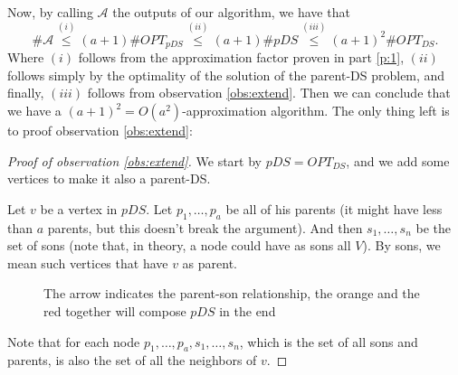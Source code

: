 \documentclass[11pt]{article}
\begin{document}
\begin{enumerate}
    Now, by calling $\mathcal{A}$ the outputs of our algorithm, we have that
    \begin{equation*}
        \#\mathcal{A} \stackrel{(i)}{\leq} (a+1)\# OPT_{pDS} \stackrel{(ii)}{\leq} (a+1) \#pDS \stackrel{(iii)}{\leq} (a+1)^2 \# OPT_{DS}.
    \end{equation*}
    Where $(i)$ follows from the approximation factor proven in part \ref{p:1}, $(ii)$ follows simply by the optimality of the solution of the parent-DS problem, and finally, $(iii)$ follows from observation \ref{obs:extend}. Then we can conclude that we have a $(a+1)^2 = O(a^2)$-approximation algorithm. The only thing left is to proof observation \ref{obs:extend}:
    \begin{proof}[Proof of observation \ref{obs:extend}]
        We start by $pDS = OPT_{DS}$, and we add some vertices to make it also a parent-DS. 
        
        
        Let $v$ be a vertex in $pDS$. Let $p_1, \dots, p_a$ be all of his parents (it might have less than $a$ parents, but this doesn't break the argument). And then $s_1,\dots,s_n$ be the set of sons (note that, in theory, a node could have as sons all $V$). By sons, we mean such vertices that have $v$ as parent.
\begin{figure}
        
            \begin{center}

    \captionsetup{width=.8\linewidth}
    \caption{The arrow indicates the parent-son relationship, the orange and the red together will compose $pDS$ in the end}\label{fig:n}
    \end{center}
\end{figure}
        Note that for each node $p_1,\dots,p_a,s_1,\dots,s_n$, which is the set of all sons and parents, is also the set of all the neighbors of $v$.


\end{proof}
\end{enumerate}
\end{document}
